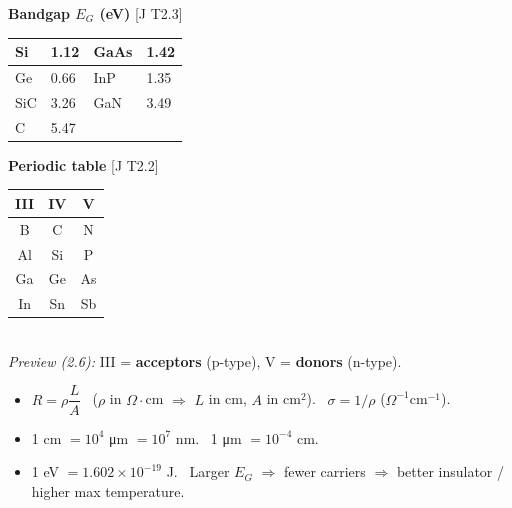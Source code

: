     {\setlength{\tabcolsep}{2.5pt}%
    \begin{minipage}[t]{0.48\linewidth}\raggedright
        \textbf{Bandgap $E_G$ (eV)} {\color{gray}[J T2.3]}\\[1pt]
        \begin{tabular}{|l|l||l|l|}
            \hline
            Si & \textbf{1.12} & GaAs & 1.42 \\ \hline
            Ge & 0.66 & InP & 1.35 \\ \hline
            SiC & 3.26 & GaN & 3.49 \\ \hline
            C & 5.47 & & \\ \hline
        \end{tabular}
    \end{minipage}\hfill
    \begin{minipage}[t]{0.48\linewidth}\raggedright
        \textbf{Periodic table} {\color{gray}[J T2.2]}\\[1pt]
        \begin{tabular}{|c|c|c|}
            \hline
            \textbf{III} & \textbf{IV} & \textbf{V} \\ \hline
            B & C & N \\
            Al & \cellcolor{subsubLight}Si & P \\
            Ga & \cellcolor{subsubLight}Ge & As \\
            In & Sn & Sb \\ \hline
        \end{tabular}\\
        \textit{Preview (2.6):} III = \textbf{acceptors} (p-type), V = \textbf{donors} (n-type).
    \end{minipage}\par}

    \begin{handy}
        \begin{itemize}
            \item $R = \rho\dfrac{L}{A}$ \ ($\rho$ in $\Omega\cdot$cm $\Rightarrow$ $L$ in cm, $A$ in cm$^2$). \ $\sigma = 1/\rho$ ($\Omega^{-1}$cm$^{-1}$).
            \item 1 cm $= 10^4$ \si{\micro\metre} $= 10^7$ nm. \ 1 \si{\micro\metre} $= 10^{-4}$ cm.
            \item 1 eV $= 1.602\times10^{-19}$ J. \ Larger $E_G$ $\Rightarrow$ fewer carriers $\Rightarrow$ better insulator / higher max temperature.
        \end{itemize}
    \end{handy}


